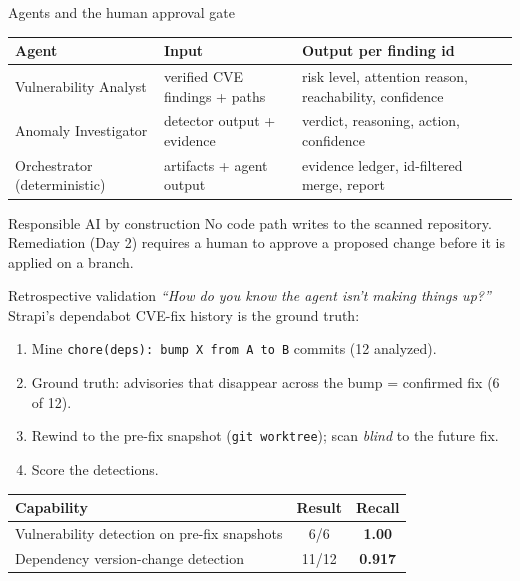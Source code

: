 \documentclass[11pt,aspectratio=169]{beamer}
\begin{document}
\begin{frame}{Agents and the human approval gate}
\begin{center}
\small
\begin{tabular}{@{}p{3.6cm}p{4.4cm}p{6cm}@{}}
\toprule
\textbf{Agent} & \textbf{Input} & \textbf{Output per finding id} \\
\midrule
Vulnerability Analyst & verified CVE findings + paths & risk level, attention reason, reachability, confidence \\
Anomaly Investigator & detector output + evidence & verdict, reasoning, action, confidence \\
Orchestrator (deterministic) & artifacts + agent output & evidence ledger, id-filtered merge, report \\
\bottomrule
\end{tabular}
\end{center}
\begin{block}{Responsible AI by construction}
No code path writes to the scanned repository. Remediation (Day 2) requires a human to approve a proposed change before it is applied on a branch.
\end{block}
\end{frame}

\begin{frame}{Retrospective validation}
\small \textit{``How do you know the agent isn't making things up?''} Strapi's dependabot CVE-fix history is the ground truth:
\begin{enumerate}\setlength\itemsep{1mm}
  \item Mine \texttt{chore(deps): bump X from A to B} commits (12 analyzed).
  \item Ground truth: advisories that disappear across the bump = confirmed fix (6 of 12).
  \item Rewind to the pre-fix snapshot (\texttt{git worktree}); scan \emph{blind} to the future fix.
  \item Score the detections.
\end{enumerate}
\begin{center}
\renewcommand{\arraystretch}{1.2}
\begin{tabular}{@{}lcc@{}}
\toprule
\textbf{Capability} & \textbf{Result} & \textbf{Recall} \\
\midrule
Vulnerability detection on pre-fix snapshots & 6/6 & \textbf{1.00} \\
Dependency version-change detection & 11/12 & \textbf{0.917} \\
\bottomrule
\end{tabular}
\end{center}
\end{frame}
\end{document}
